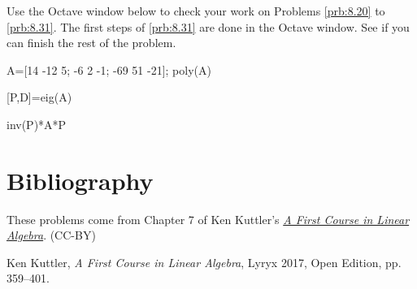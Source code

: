 \documentclass{ximera}
\begin{document}
\begin{problem}\label{oct:diagonalize}
Use the Octave window below to check your work on Problems \ref{prb:8.20} to \ref{prb:8.31}.  The first steps of \ref{prb:8.31} are done in the Octave window.  See if you can finish the rest of the problem.

A=[14 -12 5; -6 2 -1; -69 51 -21];
poly(A)

[P,D]=eig(A)

inv(P)*A*P


\end{problem}


\section*{Bibliography}
These problems come from Chapter 7 of Ken Kuttler's \href{https://open.umn.edu/opentextbooks/textbooks/a-first-course-in-linear-algebra-2017}{\it A First Course in Linear Algebra}. (CC-BY)

Ken Kuttler, {\it  A First Course in Linear Algebra}, Lyryx 2017, Open Edition, pp. 359--401. 
\end{document}

